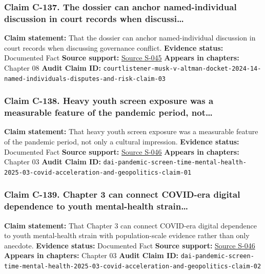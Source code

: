 \documentclass[
  american,
  11pt,
  letterpaper,
]{article}
\begin{document}
\subsubsection{Claim C-137. The dossier can anchor named-individual
discussion in court records when
discussi\ldots{}}\label{claim-c-137-the-dossier-can-anchor-named-individual-discussion-in-court-records-when-discussi}

\textbf{Claim statement:} That the dossier can anchor named-individual
discussion in court records when discussing governance conflict.
\textbf{Evidence status:} Documented Fact \textbf{Source support:}
\hyperref[source-s-045-musk-v-altman-4-24-cv-04722]{Source S-045}
\textbf{Appears in chapters:} Chapter 08 \textbf{Audit Claim ID:}
\texttt{courtlistener-musk-v-altman-docket-2024-14-named-individuals-disputes-and-risk-claim-03}

\subsubsection{Claim C-138. Heavy youth screen exposure was a measurable
feature of the pandemic period,
not\ldots{}}\label{claim-c-138-heavy-youth-screen-exposure-was-a-measurable-feature-of-the-pandemic-period-not}

\textbf{Claim statement:} That heavy youth screen exposure was a
measurable feature of the pandemic period, not only a cultural
impression. \textbf{Evidence status:} Documented Fact \textbf{Source
support:}
\hyperref[source-s-046-excessive-screen-time-is-associated-with-mental-health-problems-and-adhd-in-us-children-and-adolescents-physical-activity-and-sleep-as-parallel-mediators]{Source
S-046} \textbf{Appears in chapters:} Chapter 03 \textbf{Audit Claim ID:}
\texttt{dai-pandemic-screen-time-mental-health-2025-03-covid-acceleration-and-geopolitics-claim-01}

\subsubsection{Claim C-139. Chapter 3 can connect COVID-era digital
dependence to youth mental-health
strain\ldots{}}\label{claim-c-139-chapter-3-can-connect-covid-era-digital-dependence-to-youth-mental-health-strain}

\textbf{Claim statement:} That Chapter 3 can connect COVID-era digital
dependence to youth mental-health strain with population-scale evidence
rather than only anecdote. \textbf{Evidence status:} Documented Fact
\textbf{Source support:}
\hyperref[source-s-046-excessive-screen-time-is-associated-with-mental-health-problems-and-adhd-in-us-children-and-adolescents-physical-activity-and-sleep-as-parallel-mediators]{Source
S-046} \textbf{Appears in chapters:} Chapter 03 \textbf{Audit Claim ID:}
\texttt{dai-pandemic-screen-time-mental-health-2025-03-covid-acceleration-and-geopolitics-claim-02}
\end{document}
